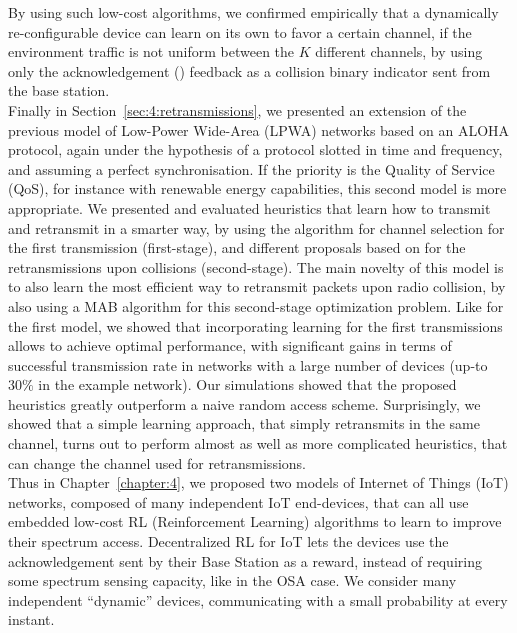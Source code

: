 %
By using such low-cost algorithms, we confirmed empirically that a dynamically re-configurable device can learn on its own to favor a certain channel, if the environment traffic is not uniform between the $K$ different channels, by using only the acknowledgement (\Ack) feedback as a collision binary indicator sent from the base station.
\\
%
\indent
Finally in Section~\ref{sec:4:retransmissions}, we presented an extension of the previous model of Low-Power Wide-Area (LPWA) networks based on an ALOHA protocol, again under the hypothesis of a protocol slotted in time and frequency, and assuming a perfect synchronisation.
If the priority is the Quality of Service (QoS), for instance with renewable energy capabilities, this second model is more appropriate.
We presented and evaluated heuristics that learn how to transmit and retransmit in a smarter way, by using the \UCB{} algorithm for channel selection for the first transmission (first-stage), and different proposals based on \UCB{} for the retransmissions upon collisions (second-stage).
The main novelty of this model is to also learn the most efficient way to retransmit packets upon radio collision, by also using a MAB algorithm for this second-stage optimization problem.
%
Like for the first model, we showed that incorporating learning for the first transmissions allows to achieve optimal performance, with significant gains in terms of successful transmission rate in networks with a large number of devices (up-to $30\%$ in the example network).
Our simulations showed that the proposed heuristics greatly outperform a naive random access scheme.
Surprisingly, we showed that a simple \UCB{} learning approach, that simply retransmits in the same channel, turns out to perform almost as well as more complicated heuristics, that can change the channel used for retransmissions.
\\
%
\indent
Thus in Chapter~\ref{chapter:4}, we proposed two models of Internet of Things (IoT) networks, composed of many independent IoT end-devices,
that can all use embedded low-cost RL (Reinforcement Learning) algorithms to learn to improve their spectrum access.
%
Decentralized RL for IoT lets the devices use the acknowledgement sent by their Base Station as a reward, instead of requiring some spectrum sensing capacity, like in the OSA case.
We consider many independent ``dynamic'' devices, communicating with a small probability at every instant.
